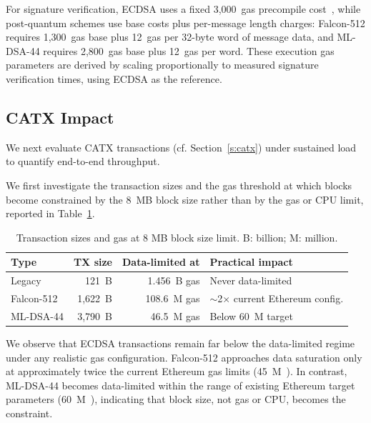 For signature verification, ECDSA uses a fixed 3,000~gas precompile cost~\cite{ETH:W14}, while post-quantum schemes use base costs plus per-message length charges: Falcon-512 requires 1,300~gas base plus 12~gas per 32-byte word of message data, and ML-DSA-44 requires 2,800~gas base plus 12~gas per word.
These execution gas parameters are derived by scaling proportionally to measured signature verification times, using ECDSA as the reference.%

\subsection{CATX Impact}\label{subsec:tx-impact}

We next evaluate CATX transactions (cf. Section~\ref{s:catx}) under sustained load to quantify end-to-end throughput. 

We first investigate the transaction sizes and the gas threshold at which blocks become constrained by the 8~MB block size rather than by the gas or CPU limit, reported in Table~\ref{tab:tx-sizes}.
\begin{table}[htbp]
\centering
\caption{Transaction sizes and gas at 8 MB block size limit. B: billion; M: million.}
\label{tab:tx-sizes}
\setlength{\tabcolsep}{8pt}
\begin{tabular}{@{}lrrl@{}}
\toprule
\textbf{Type} & \textbf{TX size} & \textbf{Data-limited at} & \textbf{Practical impact} \\
\midrule
Legacy\footnotemark & 121~B & 1.456~B gas & Never data-limited \\
Falcon-512 & 1,622~B & 108.6~M gas & $\sim$2$\times$ current Ethereum config. \\
ML-DSA-44 & 3,790~B & 46.5~M gas & Below 60~M target \\
\bottomrule
\end{tabular}
\end{table}
We observe that ECDSA transactions remain far below the data-limited regime under any realistic gas configuration.
Falcon-512 approaches data saturation only at approximately twice the current Ethereum gas limits (45~M~\cite{eth_gas_limit_45M_2025}).
In contrast, ML-DSA-44 becomes data-limited within the range of existing Ethereum target parameters (60~M~\cite{eth_gas_limit_60M_2025}), indicating that block size, not gas or CPU, becomes the constraint.

